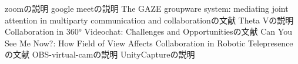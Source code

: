 zoomの説明
google meetの説明
The GAZE groupware system: mediating joint attention in multiparty communication and collaborationの文献
Theta Vの説明
Collaboration in 360° Videochat: Challenges and Opportunitiesの文献
Can You See Me Now?: How Field of View Affects Collaboration in Robotic Telepresenceの文献
OBS-virtual-camの説明
UnityCaptureの説明